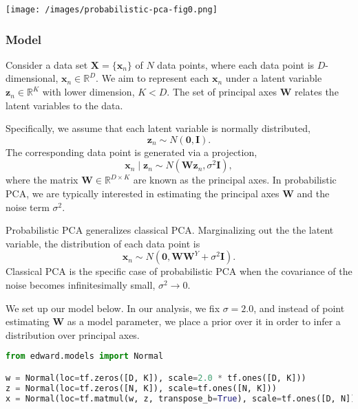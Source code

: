 \texttt{[image: /images/probabilistic-pca-fig0.png]}

\subsubsection{Model}

Consider a data set $\mathbf{X} = \{\mathbf{x}_n\}$ of $N$ data
points, where each data point is $D$-dimensional, $\mathbf{x}_n \in
\mathbb{R}^D$. We aim to represent each $\mathbf{x}_n$ under a latent
variable $\mathbf{z}_n \in \mathbb{R}^K$ with lower dimension, $K <
D$. The set of principal axes $\mathbf{W}$ relates the latent variables to
the data.

Specifically, we assume that each latent variable is normally distributed,
\begin{equation*}
\mathbf{z}_n \sim N(\mathbf{0}, \mathbf{I}).
\end{equation*}
The corresponding data point is generated via a projection,
\begin{equation*}
\mathbf{x}_n \mid \mathbf{z}_n
\sim N(\mathbf{W}\mathbf{z}_n, \sigma^2\mathbf{I}),
\end{equation*}
where the matrix $\mathbf{W}\in\mathbb{R}^{D\times K}$ are known as
the principal axes. In probabilistic PCA, we are typically interested in
estimating the principal axes $\mathbf{W}$ and the noise term
$\sigma^2$.

Probabilistic PCA generalizes classical PCA. Marginalizing out the the
latent variable, the distribution of each data point is
\begin{equation*}
\mathbf{x}_n \sim N(\mathbf{0}, \mathbf{W}\mathbf{W}^Y + \sigma^2\mathbf{I}).
\end{equation*}
Classical PCA is the specific case of probabilistic PCA when the
covariance of the noise becomes infinitesimally small, $\sigma^2 \to
0$.

We set up our model below. In our analysis, we fix $\sigma=2.0$, and
instead of point estimating $\mathbf{W}$ as a model parameter, we
place a prior over it in order to infer a distribution over principal
axes.

\begin{lstlisting}[language=Python]
from edward.models import Normal

w = Normal(loc=tf.zeros([D, K]), scale=2.0 * tf.ones([D, K]))
z = Normal(loc=tf.zeros([N, K]), scale=tf.ones([N, K]))
x = Normal(loc=tf.matmul(w, z, transpose_b=True), scale=tf.ones([D, N]))

\end{lstlisting}

